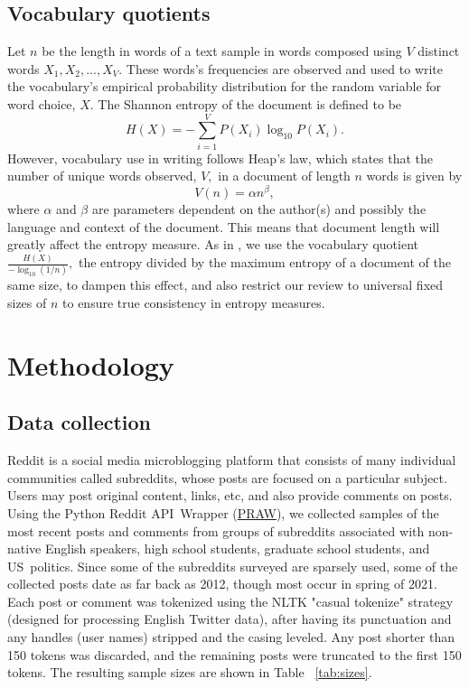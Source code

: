 \documentclass[sigconf]{acmart}
\begin{document}
\subsection{ Vocabulary quotients}

Let $n$ be the length in words of a text sample in words composed using $V$
distinct words $X_{1},X_{2},...,X_{V}$. These words's frequencies are
observed and used to write the vocabulary's empirical probability
distribution for the random variable for word choice, $X$. The Shannon
entropy of the document is defined to be%
\[
H(X)=-\sum_{i=1}^{V}P(X_{i})\log _{10}P(X_{i}).
\]%
However, vocabulary use in writing follows Heap's law, which states that the
number of unique words observed, $V,$ in a document of length $n$ words is
given by%
\[
V(n)=\alpha n^{\beta },
\]%
where $\alpha $ and $\beta $ are parameters dependent on the author(s) and
possibly the language and context of the document. This means that document
length will greatly affect the entropy measure. As in \cite{dale2000handbook}%
, \cite{rajput2018novel} we use the vocabulary quotient $\frac{H(X)}{-\log
_{10}\left( 1/n\right) },$ the entropy divided by the maximum entropy of a
document of the same size, to dampen this effect, and also restrict our
review to universal fixed sizes of $n$ to ensure true consistency in entropy
measures.

\section{Methodology}

\subsection{Data collection}

Reddit is a social media microblogging platform that consists of many
individual communities called subreddits, whose posts are focused on a
particular subject. Users may post original content, links, etc, and also
provide comments on posts. Using the Python Reddit API\ Wrapper
(\href{https://praw.readthedocs.io/en/latest/}{PRAW}),
we collected samples of the most recent posts and comments from groups of
subreddits associated with non-native English speakers, high school
students, graduate school students, and US\ politics. Since some of the
subreddits surveyed are sparsely used, some of the collected posts date as
far back as 2012, though most occur in spring of 2021. Each post or comment
was tokenized using the NLTK "casual tokenize" strategy (designed for
processing English Twitter data), after having its punctuation and any
handles (user names) stripped and the casing leveled. Any post shorter than
150 tokens was discarded, and the remaining posts were truncated to the
first 150 tokens. The resulting sample sizes are shown in Table ~\ref{tab:sizes}.
\end{document}
